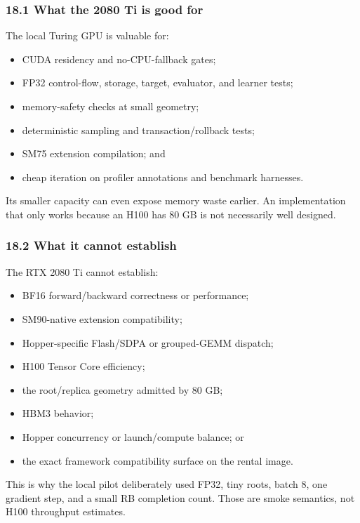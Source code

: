 \documentclass[
  10pt,
  letterpaper,
]{article}
\providecommand{\tightlist}{%
  \setlength{\itemsep}{0pt}\setlength{\parskip}{0pt}}
\begin{document}
\subsubsection{18.1 What the 2080 Ti is good
for}\label{181-what-the-2080-ti-is-good-for}

The local Turing GPU is valuable for:

\begin{itemize}
\tightlist
\item
  CUDA residency and no-CPU-fallback gates;
\item
  FP32 control-flow, storage, target, evaluator, and learner tests;
\item
  memory-safety checks at small geometry;
\item
  deterministic sampling and transaction/rollback tests;
\item
  SM75 extension compilation; and
\item
  cheap iteration on profiler annotations and benchmark harnesses.
\end{itemize}

Its smaller capacity can even expose memory waste earlier. An
implementation that only works because an H100 has 80 GB is not
necessarily well designed.

\subsubsection{18.2 What it cannot
establish}\label{182-what-it-cannot-establish}

The RTX 2080 Ti cannot establish:

\begin{itemize}
\tightlist
\item
  BF16 forward/backward correctness or performance;
\item
  SM90-native extension compatibility;
\item
  Hopper-specific Flash/SDPA or grouped-GEMM dispatch;
\item
  H100 Tensor Core efficiency;
\item
  the root/replica geometry admitted by 80 GB;
\item
  HBM3 behavior;
\item
  Hopper concurrency or launch/compute balance; or
\item
  the exact framework compatibility surface on the rental image.
\end{itemize}

This is why the local pilot deliberately used FP32, tiny roots, batch 8,
one gradient step, and a small RB completion count. Those are smoke
semantics, not H100 throughput estimates.
\end{document}

